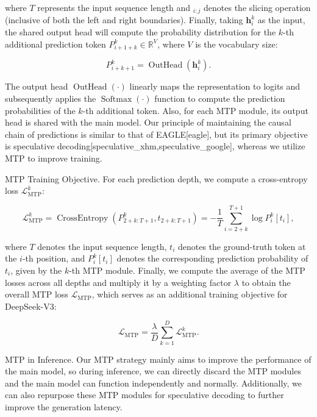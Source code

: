 \documentclass[11pt,a4paper]{article}
\begin{document}
where $T$ represents the input sequence length and $_{i:j}$ denotes the slicing operation (inclusive of both the left and right boundaries). Finally, taking $\mathbf{h}_{i}^{k}$ as the input, the shared output head will compute the probability distribution for the $k$-th additional prediction token $P_{i+1+k}^{k} \in \mathbb{R}^{V}$, where $V$ is the vocabulary size:

$$\begin{equation}
    P_{i+k+1}^{k} = \operatorname{OutHead}(\mathbf{h}_{i}^{k}).
\end{equation}$$

The output head $\operatorname{OutHead}(\cdot)$ linearly maps the representation to logits and subsequently applies the $\operatorname{Softmax}(\cdot)$ function to compute the prediction probabilities of the $k$-th additional token. Also, for each MTP module, its output head is shared with the main model. Our principle of maintaining the causal chain of predictions is similar to that of EAGLE[eagle], but its primary objective is speculative decoding[speculative\_xhm,speculative\_google], whereas we utilize MTP to improve training.

MTP Training Objective. For each prediction depth, we compute a cross-entropy loss $\mathcal{L}_{\text{MTP}}^{k}$:

$$\begin{equation}
    \mathcal{L}_{\text{MTP}}^{k} = \operatorname{CrossEntropy}(P_{2 + k:T + 1}^{k}, t_{2 + k:T + 1}) = -\frac{1}{T} \sum_{i=2 + k}^{T + 1} \log P_i^k [t_i],
\end{equation}$$

where $T$ denotes the input sequence length, $t_i$ denotes the ground-truth token at the $i$-th position, and $P_i^k [t_i]$ denotes the corresponding prediction probability of $t_i$, given by the $k$-th MTP module. Finally, we compute the average of the MTP losses across all depths and multiply it by a weighting factor $\lambda$ to obtain the overall MTP loss $\mathcal{L}_{\text{MTP}}$, which serves as an additional training objective for DeepSeek-V3:

$$\begin{equation}
    \mathcal{L}_{\text{MTP}} = \frac{\lambda}{D} \sum_{k=1}^{D} \mathcal{L}_{\text{MTP}}^{k}.
\end{equation}$$

MTP in Inference. Our MTP strategy mainly aims to improve the performance of the main model, so during inference, we can directly discard the MTP modules and the main model can function independently and normally. Additionally, we can also repurpose these MTP modules for speculative decoding to further improve the generation latency.
\end{document}
